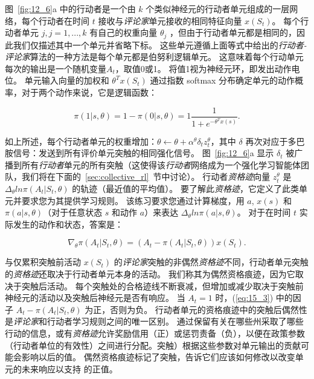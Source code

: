 图~\ref{fig:12_6}a 中的行动者是一个由 $k$ 个类似神经元的行动者单元组成的一层网络，每个行动者在时间 $t$ 接收与\textit{评论家}单元接收的相同特征向量 $x(S_t)$。
每个行动者单元 $j, j=1, ..., k$ 有自己的权重向量 $\theta_j$ ，但由于行动者单元都是相同的，因此我们仅描述其中一个单元并省略下标。
这些单元遵循上面等式中给出的\textit{行动者-评论家}算法的一种方法是每个单元都是伯努利逻辑单元。
这意味着每个行动单元每次的输出是一个随机变量$A_t$，取值0或1。
将值1视为神经元环，即发出动作电位。
单元输入向量的加权和 $\theta^T x(S_t)$ 通过指数 softmax 分布确定单元的动作概率，对于两个动作来说，它是逻辑函数：

\begin{equation} \label{eq:15_2}
	\pi (1|s, \theta) = 
		1 - \pi(0|s, \theta) 
		= 1 \frac{1}{1 + e^{-\theta^T x(s)}}.
\end{equation}


如上所述，每个行动者单元的权重增加：$\theta \longleftarrow \theta + \alpha^{\theta} \delta_t z_t^{\theta}$，其中 $\delta$ 再次对应于多巴胺信号：发送到所有评价单元突触的相同强化信号。
图~\ref{fig:12_6}a 显示 $\delta_t$ 被广播到所有\textit{行动者}单元的所有突触（这使得该\textit{行动者}网络成为一个强化学习智能体团队，我们将在下面的~\ref{sec:collective_rl}~节中讨论）。
行动者\textit{资格迹}向量 $z_t^{\theta}$ 是 $\Delta_\theta ln \pi (A_t|S_t, \theta)$ 的轨迹（最近值的平均值）。
要了解此\textit{资格迹}，它定义了此类单元并要求您为其提供学习规则。
该练习要求您通过计算梯度，用 $a$, $x(s)$ 和 $\pi(a|s, \theta)$（对于任意状态 $s$ 和动作 $a$）来表达 $\Delta _\theta ln \pi (a|s, \theta)$。
对于在时间 $t$ 实际发生的动作和状态，答案是：

\begin{equation} \label{eq:15_3}
	\nabla_{\theta} \pi (A_t | S_t, \theta)
		= (A_t - \pi(A_t|S_t, \theta)) x(S_t).
\end{equation}


与仅累积突触前活动 $x(S_t)$ 的\textit{评论家}突触的非偶然\textit{资格迹}不同，行动者单元突触的\textit{资格迹}还取决于行动者单元本身的活动。
我们称其为偶然资格痕迹，因为它取决于突触后活动。
每个突触处的合格迹线不断衰减，但增加或减少取决于突触前神经元的活动以及突触后神经元是否有响应。
当 $A_t = 1$ 时，(\ref{eq:15_3}) 中的因子 $A_t - \pi(A_t|S_t, \theta)$ 为正，否则为负。
行动者单元的资格痕迹中的突触后偶然性是\textit{评论家}和行动者学习规则之间的唯一区别。
通过保留有关在哪些州采取了哪些行动的信息，或有\textit{资格迹}允许奖励信用（正）或惩罚责备（负），以便在政策参数（行动者单位的有效性）之间进行分配。突触）根据这些参数对单元输出的贡献可能会影响以后的值。
偶然资格痕迹标记了突触，告诉它们应该如何修改以改变单元的未来响应以支持 的正值。


